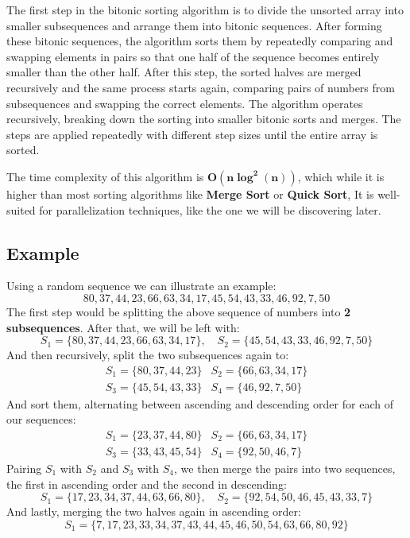 \documentclass[12pt]{report}
\begin{document}
        The first step in the bitonic sorting algorithm is to divide the unsorted array into smaller 
        subsequences and arrange them into bitonic sequences. After forming these bitonic sequences,
        the algorithm sorts them by repeatedly comparing and swapping elements in pairs so that one 
        half of the sequence becomes entirely smaller than the other half. After this step, the sorted
        halves are merged recursively and the same process starts again, comparing pairs of numbers
        from subsequences and swapping the correct elements. The algorithm operates recursively,
        breaking down the sorting into smaller bitonic sorts and merges. The steps are applied
        repeatedly with different step sizes until the entire array is sorted.

        The time complexity of this algorithm is \(\boldsymbol{O(n \log^2(n))}\), which while it is
        higher than most sorting algorithms like \textbf{Merge Sort} or \textbf{Quick Sort}, It is
        well-suited for parallelization techniques, like the one we will be discovering later.

        \newpage
        \subsection{Example}
        Using a random sequence we can illustrate an example:
        \[80, 37, 44, 23, 66, 63, 34, 17, 45, 54, 43, 33, 46, 92, 7, 50 \]
        The first step would be splitting the above sequence of
        numbers into \textbf{2 subsequences}. After that, we will be left with:
        \[
            S_1 = \{80, 37, 44, 23, 66, 63, 34, 17\}, \quad S_2 = \{45, 54, 43, 33, 46, 92, 7, 50\}
        \]
        And then recursively, split the two subsequences again to:
        \[
            \begin{array}{cc}
                S_1 = \{80, 37, 44, 23\} & S_2 = \{66, 63, 34, 17\} \\
                S_3 = \{45, 54, 43, 33\} & S_4 = \{46, 92, 7, 50\}
            \end{array}
        \]
        And sort them, alternating between ascending and descending order for each of our sequences:
        \[
            \begin{array}{cc}
                S_1 = \{23, 37, 44, 80\} & S_2 = \{66, 63, 34, 17\} \\
                S_3 = \{33, 43, 45, 54\} & S_4 = \{92, 50, 46, 7\}
            \end{array}
        \]
        Pairing $S_1$ with $S_2$ and $S_3$ with $S_4$, we then merge the pairs into two sequences, the first in ascending order and the second in descending:
        \[
            S_1 = \{17, 23, 34, 37, 44, 63, 66, 80\}, \quad S_2 = \{92, 54, 50, 46, 45, 43, 33, 7\}
        \]
        And lastly, merging the two halves again in ascending order:
        \[
            S_1 = \{7, 17, 23, 33, 34, 37, 43, 44, 45, 46, 50, 54, 63, 66, 80, 92\}
        \]
\end{document}
